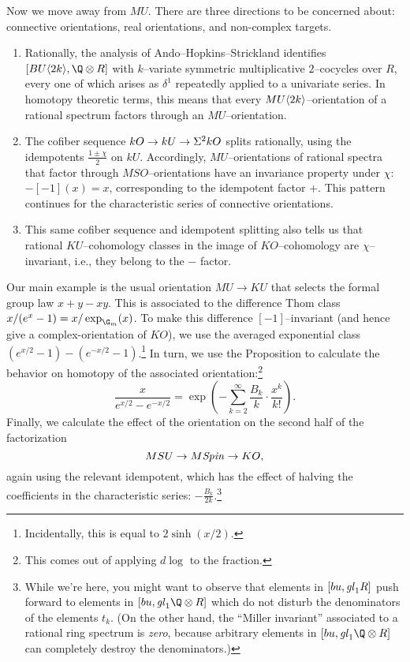 Now we move away from $MU$.  There are three directions to be concerned about: connective orientations, real orientations, and non-complex targets.
\begin{enumerate}
\item Rationally, the analysis of Ando--Hopkins--Strickland identifies $[BU\<2k\>, \Q \otimes R]$ with $k$--variate symmetric multiplicative $2$--cocycles over $R$, every one of which arises as $\delta^1$ repeatedly applied to a univariate series.  In homotopy theoretic terms, this means that every $MU\langle2k\rangle$--orientation of a rational spectrum factors through an $MU$--orientation.
\item The cofiber sequence $kO \to kU \to \Sigma^2 kO$ splits rationally, using the idempotents $\frac{1 \pm \chi}{2}$ on $kU$.  Accordingly, $MU$--orientations of rational spectra that factor through $MSO$--orientations have an invariance property under $\chi$: $-[-1](x) = x$, corresponding to the idempotent factor $+$.  This pattern continues for the characteristic series of connective orientations.
\item This same cofiber sequence and idempotent splitting also tells us that rational $KU$--cohomology classes in the image of $KO$--cohomology are $\chi$--invariant, i.e., they belong to the $-$ factor.
\end{enumerate}

Our main example is the usual orientation $MU \to KU$ that selects the formal group law $x + y - xy$.  This is associated to the difference Thom class $x / (e^x - 1) = x / \exp_{\G_m}(x)$.  To make this difference $[-1]$--invariant (and hence give a complex-orientation of $KO$), we use the averaged exponential class $(e^{x/2} - 1) - (e^{-x/2} - 1)$.\footnote{Incidentally, this is equal to $2\operatorname{sinh}(x/2)$.}  In turn, we use the Proposition to calculate the behavior on homotopy of the associated orientation:\footnote{This comes out of applying $d\log$ to the fraction.} \[\frac{x}{e^{x/2} - e^{-x/2}} = \exp\left(-\sum_{k=2}^\infty \frac{B_k}{k} \cdot \frac{x^k}{k!}\right).\]  Finally, we calculate the effect of the orientation on the second half of the factorization \[MSU \to M\mathit{Spin} \to KO,\] again using the relevant idempotent, which has the effect of halving the coefficients in the characteristic series: $-\frac{B_k}{2k}$.\footnote{While we're here, you might want to observe that elements in $[bu, \mathit{gl}_1 R]$ push forward to elements in $[bu, \gl_1 \Q \otimes R]$ which do not disturb the denominators of the elements $t_k$.  (On the other hand, the ``Miller invariant'' associated to a rational ring spectrum is \emph{zero}, because arbitrary elements in $[bu, \gl_1 \Q \otimes R]$ can completely destroy the denominators.)}

